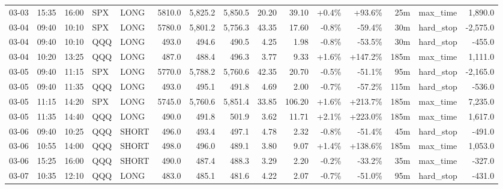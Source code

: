 \documentclass[11pt,a4paper,twoside]{article}
\begin{document}
\begin{landscape}
\begin{center}
\begin{longtable}{>{\color{txtmain}}l l l l l r r r r r r r r >{\color{txtmain}}l r}
03-03 & 15:35 & 16:00 & SPX & LONG & 5810.0 & 5,825.2 & 5,850.5 & 20.20 & 39.10 & \textcolor{wingreen}{+0.4\%} & \textcolor{wingreen}{+93.6\%} & 25m & max\_time & \textcolor{wingreen}{1,890.0} \\
03-04 & 09:40 & 10:10 & SPX & LONG & 5780.0 & 5,801.2 & 5,756.3 & 43.35 & 17.60 & \textcolor{lossred}{-0.8\%} & \textcolor{lossred}{-59.4\%} & 30m & hard\_stop & \textcolor{lossred}{-2,575.0} \\
03-04 & 09:40 & 10:10 & QQQ & LONG & 493.0 & 494.6 & 490.5 & 4.25 & 1.98 & \textcolor{lossred}{-0.8\%} & \textcolor{lossred}{-53.5\%} & 30m & hard\_stop & \textcolor{lossred}{-455.0} \\
03-04 & 10:20 & 13:25 & QQQ & LONG & 487.0 & 488.4 & 496.3 & 3.77 & 9.33 & \textcolor{wingreen}{+1.6\%} & \textcolor{wingreen}{+147.2\%} & 185m & max\_time & \textcolor{wingreen}{1,111.0} \\
03-05 & 09:40 & 11:15 & SPX & LONG & 5770.0 & 5,788.2 & 5,760.6 & 42.35 & 20.70 & \textcolor{lossred}{-0.5\%} & \textcolor{lossred}{-51.1\%} & 95m & hard\_stop & \textcolor{lossred}{-2,165.0} \\
03-05 & 09:40 & 11:35 & QQQ & LONG & 493.0 & 495.1 & 491.8 & 4.69 & 2.00 & \textcolor{lossred}{-0.7\%} & \textcolor{lossred}{-57.2\%} & 115m & hard\_stop & \textcolor{lossred}{-536.0} \\
03-05 & 11:15 & 14:20 & SPX & LONG & 5745.0 & 5,760.6 & 5,851.4 & 33.85 & 106.20 & \textcolor{wingreen}{+1.6\%} & \textcolor{wingreen}{+213.7\%} & 185m & max\_time & \textcolor{wingreen}{7,235.0} \\
03-05 & 11:35 & 14:40 & QQQ & LONG & 490.0 & 491.8 & 501.9 & 3.62 & 11.71 & \textcolor{wingreen}{+2.1\%} & \textcolor{wingreen}{+223.0\%} & 185m & max\_time & \textcolor{wingreen}{1,617.0} \\
03-06 & 09:40 & 10:25 & QQQ & SHORT & 496.0 & 493.4 & 497.1 & 4.78 & 2.32 & \textcolor{lossred}{-0.8\%} & \textcolor{lossred}{-51.4\%} & 45m & hard\_stop & \textcolor{lossred}{-491.0} \\
03-06 & 10:55 & 14:00 & QQQ & SHORT & 498.0 & 496.0 & 489.1 & 3.80 & 9.07 & \textcolor{wingreen}{+1.4\%} & \textcolor{wingreen}{+138.6\%} & 185m & max\_time & \textcolor{wingreen}{1,053.0} \\
03-06 & 15:25 & 16:00 & QQQ & SHORT & 490.0 & 487.4 & 488.3 & 3.29 & 2.20 & \textcolor{lossred}{-0.2\%} & \textcolor{lossred}{-33.2\%} & 35m & max\_time & \textcolor{lossred}{-327.0} \\
03-07 & 10:35 & 12:10 & QQQ & LONG & 483.0 & 485.1 & 481.6 & 4.22 & 2.07 & \textcolor{lossred}{-0.7\%} & \textcolor{lossred}{-51.0\%} & 95m & hard\_stop & \textcolor{lossred}{-431.0} \\

\end{longtable}
\end{center}
\end{landscape}
\end{document}
